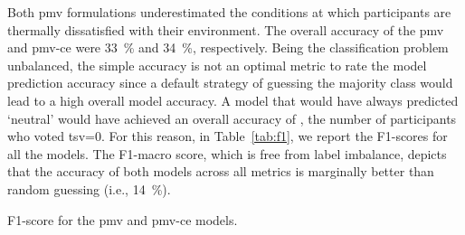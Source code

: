 Both \ac{pmv} formulations underestimated the conditions at which participants are thermally dissatisfied with their environment.
The overall accuracy of the \ac{pmv} and \ac{pmv-ce} were \qty{33}{\percent} and \qty{34}{\percent}, respectively.
Being the classification problem unbalanced, the simple accuracy is not an optimal metric to rate the model prediction accuracy since a default strategy of guessing the majority class would lead to a high overall model accuracy.
A model that would have always predicted `neutral' would have achieved an overall accuracy of , the number of participants who voted \ac{tsv}=0.
For this reason, in Table~\ref{tab:f1}, we report the F1-scores for all the models.
The F1-macro score, which is free from label imbalance, depicts that the accuracy of both models across all metrics is marginally better than random guessing (i.e., \qty{14}{\percent}).
\begin{table}[htb!]
    \centering
    
    \caption{F1-score for the \ac{pmv} and \ac{pmv-ce} models.}
    \label{tab:f1}
\end{table}


